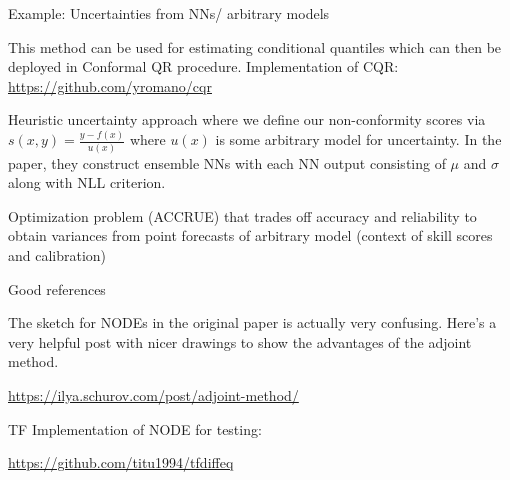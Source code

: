 \documentclass[usenames,dvipsnames]{beamer}
\theoremstyle{definition}
\let\oldcite=\cite
\renewcommand{\cite}[2][]{\textcolor{green}{\oldcite[#1]{#2}}}
\begin{document}



\begin{frame}{Example: Uncertainties from NNs/ arbitrary models}
    \cite{pearce_high-quality_2018}

    This method can be used for estimating conditional quantiles which can then be deployed in Conformal QR procedure. Implementation of CQR: \url{https://github.com/yromano/cqr}

    \cite{lakshminarayanan_simple_2017}

    Heuristic uncertainty approach where we define our non-conformity scores via $s(x, y) = \frac{y - f(x)}{u(x)}$ where $u(x)$ is some arbitrary model for uncertainty. In the paper, they construct ensemble NNs with each NN output consisting of $\mu$ and $\sigma$ along with NLL criterion.

    \cite{camporeale_accrue:_2021}

    Optimization problem (ACCRUE) that trades off accuracy and reliability to obtain variances from point forecasts of arbitrary model (context of skill scores and calibration)

\end{frame}

\begin{frame}{Good references}

    The sketch for NODEs in the original paper is actually very confusing. Here's a very helpful post with nicer drawings to show the advantages of the adjoint method.

    \url{https://ilya.schurov.com/post/adjoint-method/}


    TF Implementation of NODE for testing:

    \url{https://github.com/titu1994/tfdiffeq}

\end{frame}


\end{document}

